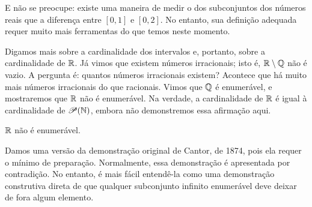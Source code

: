 E não se preocupe: existe uma maneira de medir o  dos subconjuntos
dos números reais que
a diferença entre $[0,1]$ e $[0,2]$. No entanto, sua definição adequada
requer muito mais ferramentas do que temos neste momento.

Digamos mais sobre a cardinalidade dos intervalos e, portanto, sobre a
cardinalidade de ${\mathbb{R}}$. Já vimos que existem números irracionais;
isto é,
${\mathbb{R}} \setminus {\mathbb{Q}}$ não é vazio. A pergunta é: quantos números irracionais
existem? Acontece que há muito mais números irracionais do que racionais.
Vimos que ${\mathbb{Q}}$ é enumerável, e mostraremos
que ${\mathbb{R}}$ não é enumerável.
Na verdade, a cardinalidade de ${\mathbb{R}}$ é
igual à cardinalidade de ${\mathscr{P}}({\mathbb{N}})$, embora não demonstremos
essa afirmação aqui.

\begin{thm}[Cantor]
${\mathbb{R}}$ não é enumerável.
\end{thm}

Damos uma versão da demonstração original de Cantor,
de 1874, pois ela requer o mínimo de preparação. Normalmente, essa demonstração é apresentada
por contradição. No entanto, é mais fácil
entendê-la como uma demonstração construtiva direta de que qualquer subconjunto infinito enumerável
deve deixar de fora algum elemento.

